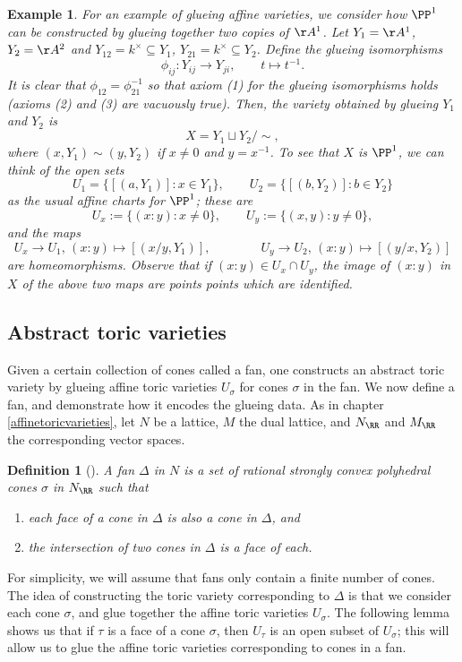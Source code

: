 \documentclass[12pt]{amsart}
\theoremstyle{plain}
\newtheorem{definition}[theorem]{Definition}
\newtheorem{example}[theorem]{Example}
\begin{document}
\begin{example}
For an example of glueing affine varieties, we consider how $\PP^1$ can be constructed by glueing together two copies of $\AA^1$.
Let $Y_1=\AA^1$, $Y_2 = \AA^2$ and $Y_12 = k^\times \subseteq Y_1$, $Y_{21} = k^\times \subseteq Y_2$.
Define the glueing isomorphisms
$$\phi_{ij} : Y_{ij} \to Y_{ji}, \qquad t \mapsto t^{-1}.$$
It is clear that $\phi_{12} = \phi_{21}^{-1}$ so that axiom (1) for the glueing isomorphisms holds (axioms (2) and (3) are vacuously true).
Then, the variety obtained by glueing $Y_1$ and $Y_2$ is
$$X = Y_1 \sqcup Y_2 / \sim,$$
where $(x, Y_1) \sim (y, Y_2)$ if $x \ne 0$ and $y = x^{-1}$.
To see that $X$ is $\PP^1$, we can  think of the open sets
$$U_1 = \{[(a, Y_1)] : x \in Y_1\}, \qquad U_2 = \{[(b, Y_2)] : b \in Y_2\}$$
as the usual affine charts for $\PP^1$;
these are
$$U_x := \{(x:y) : x \ne 0\}, \qquad U_y := \{(x, y) : y \ne 0\},$$
and the maps
$$U_x \to U_1, \, (x : y)\mapsto [(x/y, Y_1)], \qquad \qquad U_y \to U_2, \, (x : y)\mapsto [(y/x, Y_2)]$$
are homeomorphisms.
Observe that if $(x : y) \in U_x \cap U_y$, the image of $(x : y)$ in $X$ of the above two maps are points points which are identified.
\end{example}

\subsection{Abstract toric varieties}
Given a certain collection of cones called a fan, one constructs an abstract toric variety by glueing affine toric varieties $U_\sigma$ for cones $\sigma$ in the fan.
We now define a fan, and demonstrate how it encodes the glueing data.
As in chapter \ref{affinetoricvarieties}, let $N$ be a lattice, $M$ the dual lattice, and $N_\RR$ and $M_\RR$ the corresponding vector spaces.

\begin{definition}[{\cite[\S 1.4]{Fulton93}}]
A fan $\Delta$ in $N$ is a set of rational strongly convex polyhedral cones $\sigma$ in $N_\RR$ such that
\begin{enumerate}
\item
each face of a cone in $\Delta$ is also a cone in $\Delta$, and
\item
the intersection of two cones in $\Delta$ is a face of each.
\end{enumerate}
\end{definition}

For simplicity, we will assume that fans only contain a finite number of cones.
The idea of constructing the toric variety corresponding to $\Delta$ is that we consider each cone $\sigma$, and glue together the affine toric varieties $U_\sigma$.
The following lemma shows us that if $\tau$ is a face of a cone $\sigma$, then $U_\tau$ is an open subset of $U_\sigma$;
this will allow us to glue the affine toric varieties corresponding to cones in a fan.
\end{document}

